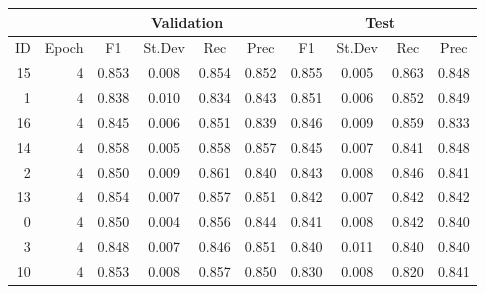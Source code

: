 \begin{tabular}{rr|cccc|cccc}
\hline
        &        &             \multicolumn{4}{c|}{Validation}             & \multicolumn{4}{c}{Test} \\
\hline
     ID &  Epoch &       F1 &      St.Dev &   Rec & Prec &       F1 &       St.Dev &  Rec   &  Prec \\
\hline
     15 &      4 &    0.853 &       0.008 &    0.854 &     0.852 &    0.855 &        0.005 &     0.863 &      0.848 \\
      1 &      4 &    0.838 &       0.010 &    0.834 &     0.843 &    0.851 &        0.006 &     0.852 &      0.849 \\
     16 &      4 &    0.845 &       0.006 &    0.851 &     0.839 &    0.846 &        0.009 &     0.859 &      0.833 \\
     14 &      4 &    0.858 &       0.005 &    0.858 &     0.857 &    0.845 &        0.007 &     0.841 &      0.848 \\
      2 &      4 &    0.850 &       0.009 &    0.861 &     0.840 &    0.843 &        0.008 &     0.846 &      0.841 \\
     13 &      4 &    0.854 &       0.007 &    0.857 &     0.851 &    0.842 &        0.007 &     0.842 &      0.842 \\
      0 &      4 &    0.850 &       0.004 &    0.856 &     0.844 &    0.841 &        0.008 &     0.842 &      0.840 \\
      3 &      4 &    0.848 &       0.007 &    0.846 &     0.851 &    0.840 &        0.011 &     0.840 &      0.840 \\
     10 &      4 &    0.853 &       0.008 &    0.857 &     0.850 &    0.830 &        0.008 &     0.820 &      0.841 \\
\hline 
\end{tabular}
